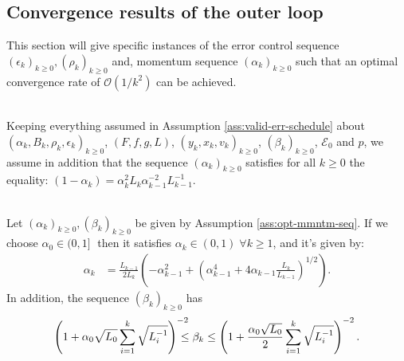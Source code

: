\documentclass[12pt]{article}
\begin{document}
    \subsection{Convergence results of the outer loop}
        This section will give specific instances of the error control sequence $(\epsilon_k)_{k \ge 0}, (\rho_k)_{k \ge0}$ and, momentum sequence $(\alpha_k)_{k \ge0}$ such that an optimal convergence rate of $\mathcal O(1/k^2)$ can be achieved. 
        \begin{assumption}\;\label{ass:opt-mmntm-seq}\\
            Keeping everything assumed in Assumption \ref{ass:valid-err-schedule} about $(\alpha_k, B_k, \rho_k, \epsilon_k)_{k \ge 0}$, $(F, f, g, L)$, $(y_k, x_k, v_k)_{k \ge 0}$, $(\beta_k)_{k \ge 0}$, $\mathcal E_0$ and $p$, we assume in addition that the sequence $(\alpha_k)_{k \ge 0}$ satisfies for all $k \ge 0$ the equality: $(1 - \alpha_k) = \alpha_{k}^2L_k\alpha_{k - 1}^{-2}L_{k - 1}^{-1}$. 
        \end{assumption}
        \begin{lemma}\;\label{lemma:opt-mmntm-seq}\\
            Let $(\alpha_k)_{k \ge 0}, (\beta_k)_{k \ge 0}$ be given by Assumption \ref{ass:opt-mmntm-seq}. 
            If we choose $\alpha_0 \in (0, 1]\;$ then it satisfies $\alpha_k \in (0, 1)\;\forall k\ge 1$, and it's given by: 
            \begin{align*}
                \alpha_k &=
                \frac{L_{k - 1}}{2L_k}\left(
                    - \alpha_{k - 1}^2 + \left(
                        \alpha_{k - 1}^4 + 4 \alpha_{k - 1}\frac{L_k}{L_{k - 1}}
                    \right)^{1/2}
                \right). 
            \end{align*}
            In addition, the sequence $(\beta_k)_{k \ge 0}$ has
            \begin{align*}
                \left(
                    1 + \alpha_0\sqrt{L_0}\sum_{i = 1}^{k}\sqrt{L_i^{-1}}
                \right)^{-2}
                \hspace{-1em}\le 
                \beta_k
                \le 
                \left(
                    1 + \frac{\alpha_0\sqrt{L_0}}{2}\sum_{i = 1}^{k}\sqrt{L_i^{-1}}
                \right)^{-2}. 
            \end{align*}
        \end{lemma}
\end{document}
